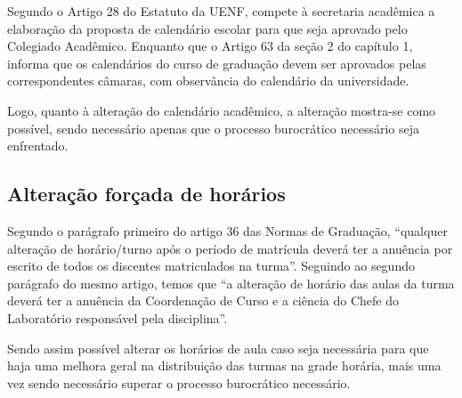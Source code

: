 
Segundo o Artigo 28 do Estatuto da UENF, compete à secretaria acadêmica a elaboração da proposta de calendário escolar para que seja aprovado pelo Colegiado Acadêmico. Enquanto que o Artigo 63 da seção 2 do capítulo 1, informa que os calendários do curso de graduação devem ser aprovados pelas correspondentes câmaras, com observância do calendário da universidade.

Logo, quanto à alteração do calendário acadêmico, a alteração mostra-se como possível, sendo necessário apenas que o processo burocrático necessário seja enfrentado.

\subsection{Alteração forçada de horários} %

Segundo o parágrafo primeiro do artigo 36 das Normas de Graduação, ``qualquer alteração de horário/turno após o período de matrícula deverá ter a anuência por escrito de todos os discentes matriculados na turma''. Seguindo ao segundo parágrafo do mesmo artigo, temos que ``a alteração de horário das aulas da turma deverá ter a anuência da Coordenação de Curso e a ciência do Chefe do Laboratório responsável pela disciplina''.

Sendo assim possível alterar os horários de aula caso seja necessária para que haja uma melhora geral na distribuição das turmas na grade horária, mais uma vez sendo necessário superar o processo burocrático necessário.
